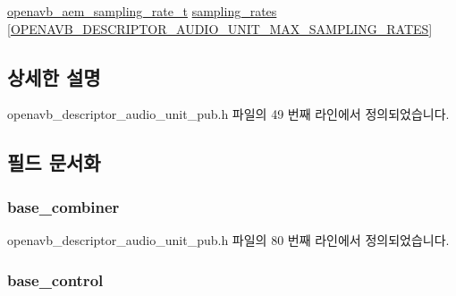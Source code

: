 \begin{DoxyCompactItemize}
\item 
\hyperlink{structopenavb__aem__sampling__rate__t}{openavb\+\_\+aem\+\_\+sampling\+\_\+rate\+\_\+t} \hyperlink{structopenavb__aem__descriptor__audio__unit__t_a71e4927bd492622a0b807cb9feb78672}{sampling\+\_\+rates} \mbox{[}\hyperlink{openavb__descriptor__audio__unit__pub_8h_a0b4a9e81e2d750e9150668d4ef90bf5c}{O\+P\+E\+N\+A\+V\+B\+\_\+\+D\+E\+S\+C\+R\+I\+P\+T\+O\+R\+\_\+\+A\+U\+D\+I\+O\+\_\+\+U\+N\+I\+T\+\_\+\+M\+A\+X\+\_\+\+S\+A\+M\+P\+L\+I\+N\+G\+\_\+\+R\+A\+T\+ES}\mbox{]}
\end{DoxyCompactItemize}


\subsection{상세한 설명}


openavb\+\_\+descriptor\+\_\+audio\+\_\+unit\+\_\+pub.\+h 파일의 49 번째 라인에서 정의되었습니다.



\subsection{필드 문서화}
\subsubsection[{\texorpdfstring{base\+\_\+combiner}{base_combiner}}]{ base\+\_\+combiner}\hypertarget{structopenavb__aem__descriptor__audio__unit__t_ae4eb9b66d01b603af5ff63d8ef0b86ee}{}\label{structopenavb__aem__descriptor__audio__unit__t_ae4eb9b66d01b603af5ff63d8ef0b86ee}


openavb\+\_\+descriptor\+\_\+audio\+\_\+unit\+\_\+pub.\+h 파일의 80 번째 라인에서 정의되었습니다.

\subsubsection[{\texorpdfstring{base\+\_\+control}{base_control}}]{ base\+\_\+control}\hypertarget{structopenavb__aem__descriptor__audio__unit__t_af2706407b5397c06e6f4c45474ba75d3}{}\label{structopenavb__aem__descriptor__audio__unit__t_af2706407b5397c06e6f4c45474ba75d3}


